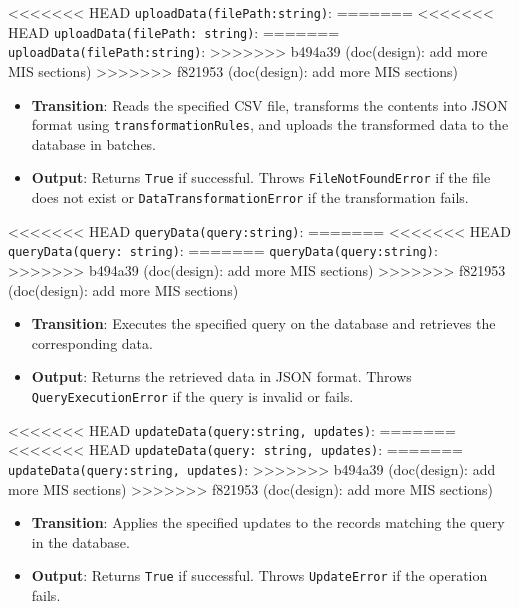 \documentclass[12pt, titlepage]{article}
\begin{document}
\begin{description}
\begin{description}
<<<<<<< HEAD
  \texttt{uploadData(filePath:string)}:
=======
<<<<<<< HEAD
  \texttt{uploadData(filePath: string)}:
=======
  \texttt{uploadData(filePath:string)}:
>>>>>>> b494a39 (doc(design): add more MIS sections)
>>>>>>> f821953 (doc(design): add more MIS sections)
  \item
  \begin{itemize}
    \item \textbf{Transition}: Reads the specified CSV file, transforms the contents into
    JSON format using \texttt{transformationRules}, and uploads the transformed data to
    the database in batches.
  \end{itemize}
  \item
  \begin{itemize}
    \item \textbf{Output}: Returns \texttt{True} if successful. Throws \texttt{FileNotFoundError}
    if the file does not exist or \texttt{DataTransformationError} if the transformation fails.
  \end{itemize}
  \item

<<<<<<< HEAD
  \texttt{queryData(query:string)}:
=======
<<<<<<< HEAD
  \texttt{queryData(query: string)}:
=======
  \texttt{queryData(query:string)}:
>>>>>>> b494a39 (doc(design): add more MIS sections)
>>>>>>> f821953 (doc(design): add more MIS sections)
  \item
  \begin{itemize}
    \item \textbf{Transition}: Executes the specified query on the database and retrieves the
    corresponding data.
  \end{itemize}
  \item 
  \begin{itemize}
    \item \textbf{Output}: Returns the retrieved data in JSON format. Throws \texttt{QueryExecutionError}
    if the query is invalid or fails.
  \end{itemize}
  \item

<<<<<<< HEAD
  \texttt{updateData(query:string, updates)}:
=======
<<<<<<< HEAD
  \texttt{updateData(query: string, updates)}:
=======
  \texttt{updateData(query:string, updates)}:
>>>>>>> b494a39 (doc(design): add more MIS sections)
>>>>>>> f821953 (doc(design): add more MIS sections)
  \item
  \begin{itemize}
    \item \textbf{Transition}: Applies the specified updates to the records matching the query
    in the database.
  \end{itemize}
  \item
  \begin{itemize}
    \item \textbf{Output}: Returns \texttt{True} if successful. Throws \texttt{UpdateError}
    if the operation fails.
  \end{itemize}
  \item


\end{description}
\end{description}
\end{document}
